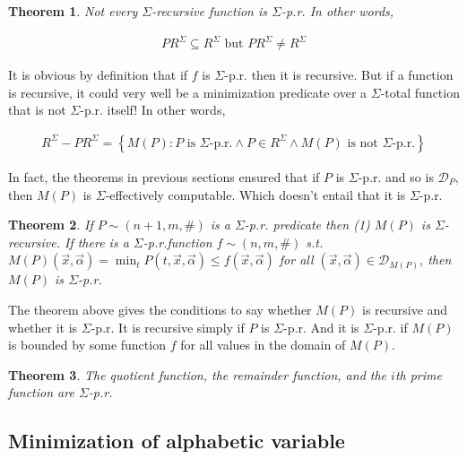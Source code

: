 \documentclass[a4paper, 12pt]{article}
\newtheorem{theorem}{Theorem}
\newtheorem{theorem}{Theorem}
\begin{document}
\begin{theorem}
    Not every $\Sigma$-recursive function is $\Sigma$-p.r. In other words, 

    \begin{align*}
        PR^{\Sigma} \subseteq R^{\Sigma} \text{ but } PR^{\Sigma} \neq R^{\Sigma}
    \end{align*}
\end{theorem}

It is obvious by definition that if $f$ is $\Sigma$-p.r. then it is recursive.
But if a function is recursive, it could very well be a minimization predicate
over a $\Sigma$-total function that is not $\Sigma$-p.r. itself! In other words, 

\begin{align*}
    R^{\Sigma} - PR^{\Sigma} = \left\{ M(P) : P \text{ is $\Sigma$-p.r.}  \land
    P \in R^{\Sigma} \land M(P) \text{ is not $\Sigma$-p.r.} \right\} 
\end{align*}

In fact, the theorems in previous sections ensured that if $P$ is $\Sigma$-p.r.
and so is $\mathcal{D}_P$, then $M(P)$ is $\Sigma$-effectively computable. Which
doesn't entail that it is $\Sigma$-p.r.

\begin{theorem}
    If $P \sim (n+1, m, \#)$ is a $\Sigma$-p.r. predicate then \textit{(1)} $M(P)$ is
    $\Sigma$-recursive. If there is a $\Sigma$-p.r.function $f \sim (n, m, \#)$
    s.t. $M(P)(\overrightarrow{x}, \overrightarrow{\alpha}) = \min_t P(t,
    \overrightarrow{x},  \overrightarrow{\alpha}) \leq f(\overrightarrow{x},
    \overrightarrow{\alpha})$ for all $(\overrightarrow{x},
    \overrightarrow{\alpha}) \in \mathcal{D}_{M(P)}$, then $M(P)$ is $\Sigma$-p.r.
\end{theorem}

The theorem above gives the conditions to say whether $M(P)$ is recursive and
whether it is $\Sigma$-p.r. It is recursive simply if $P$ is $\Sigma$-p.r. And
it is $\Sigma$-p.r. if $M(P)$ is bounded by some function $f$ for all values in
the domain of $M(P)$. 

\begin{theorem}
    The quotient function, the remainder function, and the $i$th prime function are $\Sigma$-p.r.
\end{theorem}

\subsection{Minimization of alphabetic variable}
\end{document}
